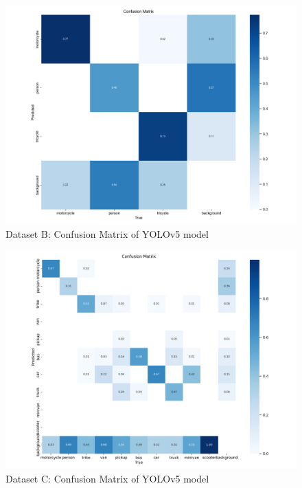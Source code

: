 \documentclass[12pt]{report} %
\begin{document}
		\begin{figure}[hb]
			\centering
			\includegraphics[width=0.95\columnwidth]{Figures/dataset_b/b_confusion_matrix.png}
			\caption{Dataset B: Confusion Matrix of YOLOv5 model}
			\label{fig:mtpDatasetYolov5LargeWeight}
		\end{figure}

		\begin{figure}[hb]
			\centering
			\includegraphics[width=0.95\columnwidth]{Figures/dataset_c/confusion_matrix.png}
			\caption{Dataset C: Confusion Matrix of YOLOv5 model}
			\label{fig:ntDatasetYolov5MediumWeight}
		\end{figure}

	\clearpage
\end{document}
